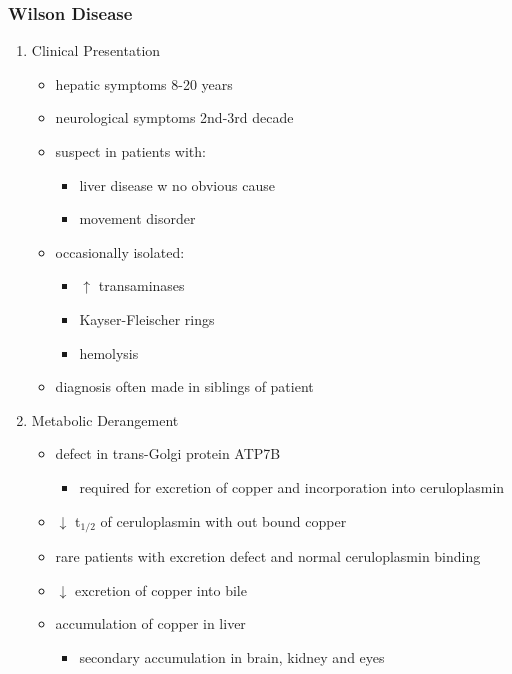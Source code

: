 \documentclass{scrartcl}
\begin{document}
\subsubsection{Wilson Disease}
\label{sec:org7adeff7}
\begin{enumerate}
\item Clinical Presentation
\label{sec:org03411e4}
\begin{itemize}
\item hepatic symptoms 8-20 years
\item neurological symptoms 2nd-3rd decade
\item suspect in patients with:
\begin{itemize}
\item liver disease w no obvious cause
\item movement disorder
\end{itemize}
\item occasionally isolated:
\begin{itemize}
\item \(\uparrow\) transaminases
\item Kayser-Fleischer rings
\item hemolysis
\end{itemize}
\item diagnosis often made in siblings of patient
\end{itemize}

\item Metabolic Derangement
\label{sec:orgf4bbf00}
\begin{itemize}
\item defect in trans-Golgi protein ATP7B
\begin{itemize}
\item required for excretion of copper and incorporation into ceruloplasmin
\end{itemize}
\item \(\downarrow\) t\(_{\text{1/2}}\) of ceruloplasmin with out bound copper
\item rare patients with excretion defect and normal ceruloplasmin binding
\item \(\downarrow\) excretion of copper into bile
\item accumulation of copper in liver
\begin{itemize}
\item secondary accumulation in brain, kidney and eyes
\end{itemize}
\end{itemize}


\end{enumerate}
\end{document}
